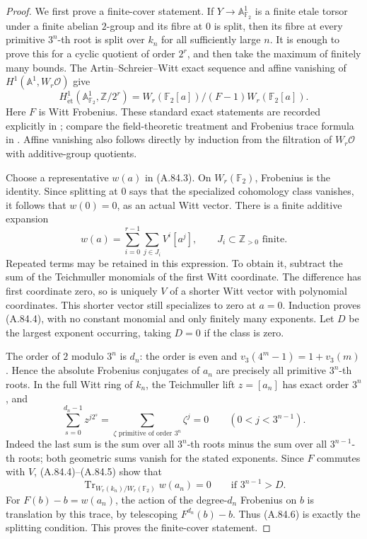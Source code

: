 \documentclass[11pt]{article}
\begin{document}
\begin{proof}
We first prove a finite-cover statement. If \(Y\to
\mathbb A^1_{\mathbb F_2}\) is a finite etale torsor under a
finite abelian \(2\)-group and its fibre at \(0\) is split,
then its fibre at every primitive \(3^n\)-th root is split over
\(k_n\) for all sufficiently large \(n\).
It is enough to prove this for a cyclic quotient of order
\(2^r\), and then take the maximum of finitely many bounds.
The Artin--Schreier--Witt exact sequence and affine vanishing
of \(H^1(\mathbb A^1,W_r\mathcal O)\) give
\[
 H^1_{\mathrm{\acute et}}(\mathbb A^1_{\mathbb F_2},
                         \mathbb Z/2^r)
 =W_r(\mathbb F_2[a])/(F-1)W_r(\mathbb F_2[a]).
 \tag{A.84.3}
\]
Here \(F\) is Witt Frobenius. These standard exact statements
are recorded explicitly in \citet[Theorem~1.2 and the following
cohomology sequence, p.~2]{AG_Sekiguchi2001}; compare the
field-theoretic treatment and Frobenius trace formula in
\citet[Theorem~3.2, Section~5.4, p.~29]{AG_KostersWan2016}.
Affine vanishing also follows directly by induction from the
filtration of \(W_r\mathcal O\) with additive-group quotients.

Choose a representative \(w(a)\) in (A.84.3).
On \(W_r(\mathbb F_2)\), Frobenius is the identity. Since
splitting at \(0\) says that the specialized cohomology class
vanishes, it follows that \(w(0)=0\), as an actual Witt vector.
There is a finite additive expansion
\[
                 w(a)=\sum_{i=0}^{r-1}\sum_{j\in J_i}
                                  V^i[a^j],
                 \qquad J_i\subset\mathbb Z_{>0}\text{ finite}.
 \tag{A.84.4}
\]
Repeated terms may be retained in this expression. To obtain
it, subtract the sum of the Teichmuller monomials of the first
Witt coordinate. The difference has first coordinate zero,
so is uniquely \(V\) of a shorter Witt vector with polynomial
coordinates. This shorter vector still specializes to zero
at \(a=0\). Induction proves (A.84.4), with no constant
monomial and only finitely many exponents. Let \(D\) be the
largest exponent occurring, taking \(D=0\) if the class is
zero.

The order of \(2\) modulo \(3^n\) is \(d_n\): the order
is even and \(v_3(4^m-1)=1+v_3(m)\). Hence the absolute
Frobenius conjugates of \(a_n\) are precisely all primitive
\(3^n\)-th roots. In the full Witt ring of \(k_n\), the
Teichmuller lift \(z=[a_n]\) has exact order \(3^n\), and
\[
 \sum_{s=0}^{d_n-1}z^{j2^s}
 =\sum_{\zeta\text{ primitive of order }3^n}\zeta^j=0
 \qquad(0<j<3^{n-1}).
 \tag{A.84.5}
\]
Indeed the last sum is the sum over all \(3^n\)-th roots
minus the sum over all \(3^{n-1}\)-th roots; both geometric
sums vanish for the stated exponents. Since \(F\) commutes
with \(V\), (A.84.4)--(A.84.5) show that
\[
 \operatorname{Tr}_{W_r(k_n)/W_r(\mathbb F_2)}w(a_n)=0
                       \qquad\text{if }3^{n-1}>D.
 \tag{A.84.6}
\]
For \(F(b)-b=w(a_n)\), the action of the degree-\(d_n\)
Frobenius on \(b\) is translation by this trace, by telescoping
\(F^{d_n}(b)-b\). Thus (A.84.6) is exactly the splitting
condition. This proves the finite-cover statement.


\end{proof}
\end{document}
